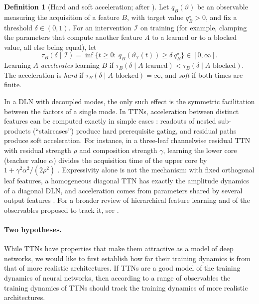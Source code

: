 \documentclass[11pt]{article}
\theoremstyle{definition}
\newtheorem{definition}[theorem]{Definition}
\numberwithin{equation}{section}
\begin{document}
\begin{definition}[Hard and soft acceleration; after {\citealp[Definition~3.1]{hfl_diagonal}}]\label{def:acceleration}
Let $q_B(\vartheta)$ be an observable measuring the acquisition of a feature $B$, with target value $q_B^\star>0$, and fix a threshold $\delta\in(0,1)$. For an intervention $\mathcal I$ on training (for example, clamping the parameters that compute another feature $A$ to a learned or to a blocked value, all else being equal), let
\[
\tau_B(\delta\mid\mathcal I)=\inf\{t\ge 0:\ q_B(\vartheta_{\mathcal I}(t))\ge \delta\, q_B^\star\}\in[0,\infty].
\]
Learning $A$ \emph{accelerates} learning $B$ if $\tau_B(\delta\mid A\text{ learned})<\tau_B(\delta\mid A\text{ blocked})$. The acceleration is \emph{hard} if $\tau_B(\delta\mid A\text{ blocked})=\infty$, and \emph{soft} if both times are finite.
\end{definition}

In a DLN with decoupled modes, the only such effect is the symmetric facilitation between the factors of a single mode. In TTNs, acceleration between distinct features can be computed exactly in simple cases \citep[Sections~5--6]{hfl_diagonal}: readouts of nested sub-products (``staircases'') produce hard prerequisite gating, and residual paths produce soft acceleration. For instance, in a three-leaf channelwise residual TTN with residual strength $\rho$ and composition strength $\gamma$, learning the lower core (teacher value $\alpha$) divides the acquisition time of the upper core by $1+\gamma^2\alpha^2/(2\rho^2)$ \citep[Proposition~6.1]{hfl_diagonal}. Expressivity alone is not the mechanism: with fixed orthogonal leaf features, a homogeneous diagonal TTN has exactly the amplitude dynamics of a diagonal DLN, and acceleration comes from parameters shared by several output features \citep[Proposition~4.1 and Section~7]{hfl_diagonal}. For a broader review of hierarchical feature learning and of the observables proposed to track it, see \citet{hfl_review}.

\paragraph{Two hypotheses.}
While TTNs have properties that make them attractive as a model of deep networks, we would like to first establish how far their training dynamics is from that of more realistic architectures. If TTNs are a good model of the training dynamics of neural networks, then according to a range of observables the training dynamics of TTNs should track the training dynamics of more realistic architectures.
\end{document}
